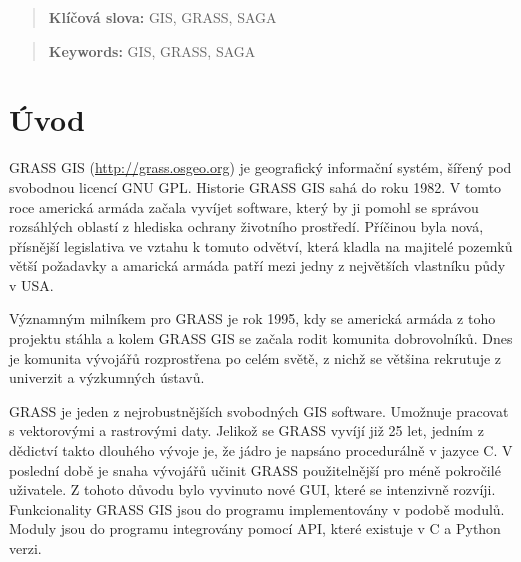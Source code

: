\documentclass[a4paper,12pt]{article}
\author{Štěpán Turek}
\newcommand{\klicslova}[2]{\noindent\textbf{#1: }#2}
\newcommand{\necislovana}[1]{%
\phantomsection
\addcontentsline{toc}{section}{#1}
\section*{#1}
\markboth{\uppercase{#1}}{}
}
\begin{document}
\pagestyle{empty}


\newpage





\begin{abstract}

\bigskip

\klicslova{Klíčová slova}{GIS, GRASS, SAGA}

\end{abstract}

\begin{abstract}

\bigskip

\klicslova{Keywords}{GIS, GRASS, SAGA}

\end{abstract}


\newpage

\newpage
\tableofcontents


\newpage
\pagestyle{fancy}

\necislovana{Úvod}



GRASS GIS (\url{http://grass.osgeo.org}) je geografický informační systém, šířený  pod svobodnou licencí GNU GPL.  
Historie GRASS GIS sahá do roku 1982. V tomto roce americká armáda začala vyvíjet software, který by ji pomohl se správou rozsáhlých oblastí z hlediska ochrany 
životního prostředí. Příčinou byla nová, přísnější legislativa ve vztahu k tomuto odvětví, která kladla na majitelé pozemků větší požadavky a amarická armáda patří mezi jedny z největších vlastníku půdy v USA.
 
Významným milníkem pro GRASS je rok 1995, kdy se americká armáda z toho projektu stáhla a kolem GRASS GIS se začala rodit komunita dobrovolníků. 
Dnes je komunita vývojářů rozprostřena po celém světě, z nichž se většina rekrutuje z univerzit a výzkumných ústavů. 

GRASS je jeden z nejrobustnějších svobodných GIS software. Umožnuje pracovat s vektorovými a rastrovými daty.
Jelikož se GRASS vyvíjí již 25 let, jedním z dědictví takto dlouhého vývoje je, že  jádro je napsáno procedurálně v jazyce C. 
V poslední době je snaha vývojářů učinit GRASS použitelnější pro méně pokročilé uživatele. Z tohoto důvodu bylo vyvinuto nové GUI, které se intenzivně rozvíji. 
Funkcionality GRASS GIS jsou do programu implementovány v podobě modulů. Moduly jsou do programu integrovány pomocí API, které existuje v C a Python verzi.
\end{document}
